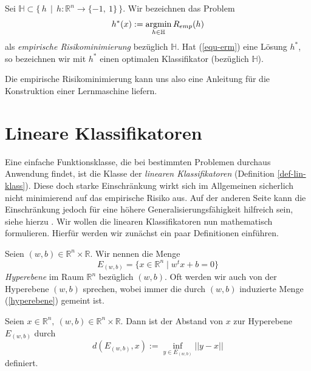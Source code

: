 \begin{definition}
	\label{definition-erm}
	Sei $\mathbb{H} \subset \{ \, h \, \mid  \, h: \mathbb{R}^n \rightarrow \{-1 ,\ 1\} \, \}$.
	Wir bezeichnen das Problem
	\begin{equation}
	\label{equ-erm}
	h^*(x) := \operatorname*{argmin}_{h \in \mathbb{H}} R_{emp}(h)
	\end{equation}
	als \emph{empirische Risikominimierung} bezüglich $\mathbb{H}$. Hat  (\ref{equ-erm}) eine Lösung $h^*$, so bezeichnen wir mit $h^*$ einen optimalen Klassifikator (bezüglich $\mathbb{H}$).
\end{definition}

Die empirische Risikominimierung kann uns also eine Anleitung für die Konstruktion einer Lernmaschine liefern. 

\section{Lineare Klassifikatoren}
Eine einfache Funktionsklasse, die bei bestimmten Problemen durchaus Anwendung findet, ist die Klasse der \emph{linearen Klassifikatoren} (Definition \ref{def-lin-klass}). Diese doch starke Einschränkung wirkt sich im Allgemeinen sicherlich nicht minimierend auf das empirische Risiko aus. Auf der anderen Seite kann die Einschränkung jedoch für eine höhere Generalisierungsfähigkeit hilfreich sein, siehe hierzu \cite{sb-umlfta}. Wir wollen die \glqq linearen Klassifikatoren\grqq{} nun mathematisch formulieren. Hierfür werden wir zunächst ein paar Definitionen einführen.

\begin{definition}[Hyperebene]
	\label{def-hyperebene}
	Seien $(w,b) \in \mathbb{R}^n \times \mathbb{R}$. Wir nennen die Menge
	\begin{equation}
		\label{hyperebene}
		E_{(w,b)}=\{ x \in \mathbb{R}^n \mid w^tx + b = 0 \}
	\end{equation}
	\emph{Hyperebene} im Raum $\mathbb{R}^n$ bezüglich $(w,b)$. Oft werden wir auch von der Hyperebene $(w,b)$ sprechen, wobei immer die durch $(w,b)$ induzierte Menge (\ref{hyperebene}) gemeint ist.
\end{definition}

\begin{definition}
	Seien $x \in \mathbb{R}^n, \ (w,b) \in \mathbb{R}^n \times \mathbb{R}$. Dann ist 
	der Abstand von $x$ zur Hyperebene $E_{(w,b)}$ durch
	\begin{equation}
		d(E_{(w,b)},x) := \inf_{y \in E_{(w,b)}} ||y-x||
	\end{equation}
	definiert.
\end{definition}


